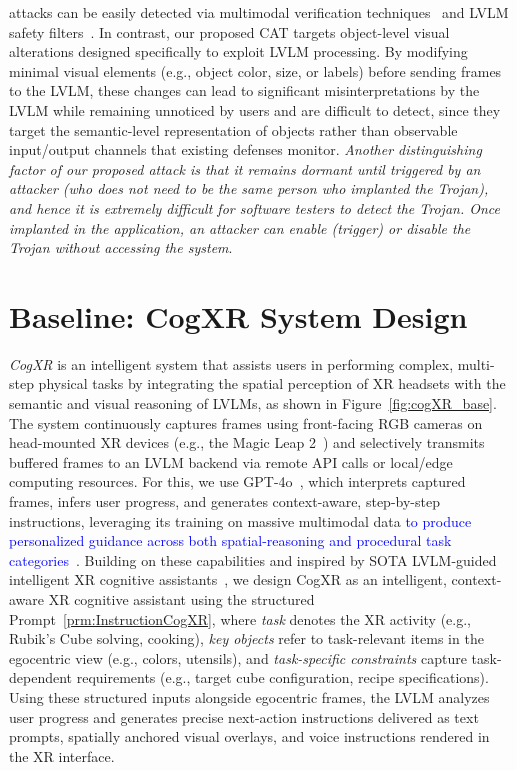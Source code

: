 \documentclass[sigconf,review,anonymous]{acmart}
\begin{document}
attacks can be easily detected via multimodal verification techniques~\cite{huang2024effective} and LVLM safety filters~\cite{liu2024formalizing}. In contrast, our proposed  CAT targets object-level visual alterations designed specifically to exploit LVLM processing. By modifying minimal visual elements (e.g., object color, size, or labels) before sending frames to the LVLM, these changes can lead to significant misinterpretations by the LVLM while remaining unnoticed by users and are difficult to detect, since they target the semantic-level representation of objects rather than observable input/output channels that existing defenses monitor. \emph{Another distinguishing factor of our proposed attack is that it remains dormant until triggered by an attacker (who does not need to be the same person who implanted the Trojan), and hence it is extremely difficult for software testers to detect the Trojan. Once implanted in the application, an attacker can enable (trigger) or disable the Trojan without accessing the system}.

\section{Baseline: CogXR System Design} \label{sec:cogxrsystemdesign} 
\textit{CogXR} is an intelligent system that assists users in performing complex, multi-step physical tasks by integrating the spatial perception of XR headsets with the semantic and visual reasoning of LVLMs, as shown in Figure~\ref{fig:cogXR_base}. The system continuously captures frames using front-facing RGB cameras on head-mounted XR devices (e.g., the Magic Leap 2~\cite{zhang2025evil}) and selectively transmits buffered frames to an LVLM backend via remote API calls or local/edge computing resources. For this, we use GPT-4o~\cite{achiam2023gpt}, which interprets captured frames, infers user progress, and generates context-aware, step-by-step instructions, leveraging its training on massive multimodal data \textcolor{blue}{to produce personalized guidance across both spatial-reasoning and procedural task categories~\cite{srinidhi2024xair,vir2024archef,ren2025rubikon}}. Building on these capabilities and inspired by SOTA LVLM-guided intelligent XR cognitive assistants~\cite{srinidhi2024xair, zhao2025guided, qorbani2025teaching}, we design CogXR as an intelligent, context-aware XR cognitive assistant using the structured Prompt~\ref{prm:InstructionCogXR}, where \textit{task} denotes the XR activity (e.g., Rubik’s Cube solving, cooking), \textit{key objects} refer to task-relevant items in the egocentric view (e.g., colors, utensils), and \textit{task-specific constraints} capture task-dependent requirements (e.g., target cube configuration, recipe specifications). Using these structured inputs alongside egocentric frames, the LVLM analyzes user progress and generates precise next-action instructions delivered as text prompts, spatially anchored visual overlays, and voice instructions rendered in the XR interface.
\end{document}
